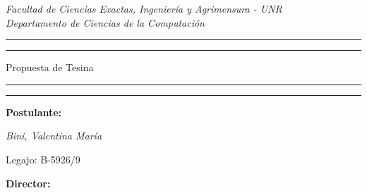 \documentclass[11pt,a4paper]{article}
\date{}
\begin{document}
\begin{titlepage}  %

	\centering %
	\scshape %
	
	\textit{Facultad de Ciencias Exactas, Ingeniería y Agrimensura - UNR\\Departamento de Ciencias de la Computación }
	
	\vspace{\baselineskip}
	
	
	\rule{\textwidth}{1.6pt}\vspace*{-\baselineskip}\vspace*{2pt} %
	\rule{\textwidth}{0.4pt} %
	
	\vspace{0.75\baselineskip} %
	
	{\huge Propuesta de Tesina\\} %
	
	\vspace{0.75\baselineskip} %
	
	\rule{\textwidth}{0.4pt}\vspace*{-\baselineskip}\vspace{3.2pt} %
	\rule{\textwidth}{1.6pt} %
	
	\vspace{\baselineskip} %
	
	
	\Large{\textbf{Postulante:}}
	
	\vspace{\baselineskip} %
	
    {\itshape\LARGE Bini, Valentina María}
	
	\vspace{0.5\baselineskip} %
	
	\large{Legajo: B-5926/9}
	
	\vspace{2\baselineskip} %

        \Large{\textbf{Director:}}
	
	\vspace{\baselineskip} %
	

\end{titlepage}
\end{document}
